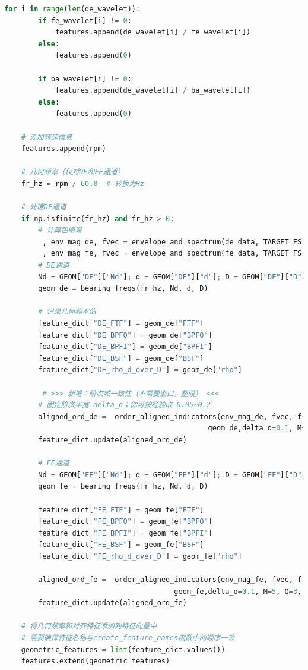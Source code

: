 \documentclass[a4paper]{CPIPC}
\numberwithin{equation}{section}
\begin{document}
\begin{lstlisting}[language=Python, caption=Feature Extraction]
    for i in range(len(de_wavelet)):
        if fe_wavelet[i] != 0:
            features.append(de_wavelet[i] / fe_wavelet[i])
        else:
            features.append(0)
        
        if ba_wavelet[i] != 0:
            features.append(de_wavelet[i] / ba_wavelet[i])
        else:
            features.append(0)
    
    # 添加转速信息
    features.append(rpm)

    # 几何频率（仅对DE和FE通道）
    fr_hz = rpm / 60.0  # 转换为Hz

    # 处理DE通道
    if np.isfinite(fr_hz) and fr_hz > 0:
        # 计算包络谱 
        _, env_mag_de, fvec = envelope_and_spectrum(de_data, TARGET_FS)
        _, env_mag_fe, fvec = envelope_and_spectrum(fe_data, TARGET_FS)
        # DE通道
        Nd = GEOM["DE"]["Nd"]; d = GEOM["DE"]["d"]; D = GEOM["DE"]["D"]
        geom_de = bearing_freqs(fr_hz, Nd, d, D)
        
        # 记录几何频率值
        feature_dict["DE_FTF"] = geom_de["FTF"]
        feature_dict["DE_BPFO"] = geom_de["BPFO"]
        feature_dict["DE_BPFI"] = geom_de["BPFI"]
        feature_dict["DE_BSF"] = geom_de["BSF"]
        feature_dict["DE_rho_d_over_D"] = geom_de["rho"]
        
         # >>> 新增：阶次域一致性（不需要窗口，整段） <<<
        # 固定阶次半宽 delta_o；你可按经验改 0.05~0.2
        aligned_ord_de =  order_aligned_indicators(env_mag_de, fvec, fr_hz,
                                                geom_de,delta_o=0.1, M=5, Q=3, prefix="DE")
        feature_dict.update(aligned_ord_de)

        # FE通道
        Nd = GEOM["FE"]["Nd"]; d = GEOM["FE"]["d"]; D = GEOM["FE"]["D"]
        geom_fe = bearing_freqs(fr_hz, Nd, d, D)
        
        feature_dict["FE_FTF"] = geom_fe["FTF"]
        feature_dict["FE_BPFO"] = geom_fe["BPFO"]
        feature_dict["FE_BPFI"] = geom_fe["BPFI"]
        feature_dict["FE_BSF"] = geom_fe["BSF"]
        feature_dict["FE_rho_d_over_D"] = geom_fe["rho"]

        aligned_ord_fe =  order_aligned_indicators(env_mag_fe, fvec, fr_hz,
                                        geom_fe,delta_o=0.1, M=5, Q=3, prefix="FE")
        feature_dict.update(aligned_ord_fe)

    # 将几何频率和对齐特征添加到特征向量中
    # 需要确保特征名称与create_feature_names函数中的顺序一致
    geometric_features = list(feature_dict.values())
    features.extend(geometric_features)


\end{lstlisting}
\end{document}
